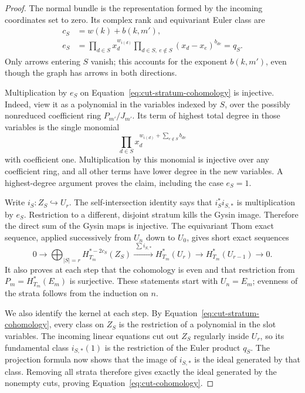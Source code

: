 \begin{proof}
The normal bundle is the representation formed by the incoming coordinates
set to zero.  Its complex rank and equivariant Euler class are
\begin{align}
 c_S&=w(k)+b(k,m'),\label{eq:cut-stratum-codimension}\\
 e_S&=\prod_{d\in S}x_d^{w_{i(d)}}
       \prod_{d\in S,\ e\notin S}(x_d-x_e)^{b_{de}}
       =q_S.\label{eq:cut-stratum-euler}
\end{align}
Only arrows entering $S$ vanish; this accounts for the exponent
$b(k,m')$, even though the graph has arrows in both directions.

Multiplication by $e_S$ on Equation~\eqref{eq:cut-stratum-cohomology} is
injective.  Indeed, view it as a polynomial in the variables indexed by
$S$, over the possibly nonreduced coefficient ring $P_{m'}/J_{m'}$.  Its
term of highest total degree in those variables is the single monomial
\[
 \prod_{d\in S}x_d^{w_{i(d)}+\sum_{e\notin S}b_{de}}
\]
with coefficient one.  Multiplication by this monomial is injective over
any coefficient ring, and all other terms have lower degree in the new
variables.  A highest-degree argument proves the claim, including the
case $e_S=1$.

Write $i_S:Z_S\hookrightarrow U_r$.  The self-intersection identity says
that $i_S^*i_{S,*}$ is multiplication by $e_S$.  Restriction to a different,
disjoint stratum kills the Gysin image.  Therefore the direct sum of the
Gysin maps is injective.  The equivariant Thom exact sequence, applied
successively from $U_n$ down to $U_0$, gives short exact sequences
\begin{equation}\label{eq:cut-thom-sequence}
 0\longrightarrow
 \bigoplus_{|S|=r}H_{T_m}^{*-2c_S}(Z_S)
 \xrightarrow{\ \sum i_{S,*}\ }H_{T_m}^*(U_r)
 \longrightarrow H_{T_m}^*(U_{r-1})\longrightarrow0.
\end{equation}
It also proves at each step that the cohomology is even and that
restriction from $P_m=H_{T_m}^*(E_m)$ is surjective.  These statements start
with $U_n=E_m$; evenness of the strata follows from the induction on $n$.

We also identify the kernel at each step.  By
Equation~\eqref{eq:cut-stratum-cohomology}, every class on $Z_S$ is the
restriction of a polynomial in the slot variables.  The incoming linear
equations cut out $Z_S$ regularly inside $U_r$, so its fundamental class
$i_{S,*}(1)$ is the restriction of the Euler product $q_S$.  The projection
formula now shows that the image of $i_{S,*}$ is the ideal generated by
that class.  Removing all strata therefore gives exactly the ideal
generated by the nonempty cuts, proving Equation~\eqref{eq:cut-cohomology}.


\end{proof}
